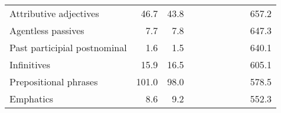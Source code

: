 \begin{table}[!t]
\begin{tabular*}{\linewidth}{@{\extracolsep{\fill}}lrrrrrrrrr}
Attributive adjectives & 46.7 & 43.8 & {\cellcolor[HTML]{92C5DE}{\textcolor[HTML]{000000}{140\%}}} & {\cellcolor[HTML]{92C5DE}{\textcolor[HTML]{000000}{150\%}}} & {\cellcolor[HTML]{F7F7F7}{\textcolor[HTML]{000000}{100\%}}} & {\cellcolor[HTML]{F7F7F7}{\textcolor[HTML]{000000}{104\%}}} & {\cellcolor[HTML]{FDDBC7}{\textcolor[HTML]{000000}{79\%}}} & {\cellcolor[HTML]{FDDBC7}{\textcolor[HTML]{000000}{83\%}}} & 657.2 \\ 
Agentless passives & 7.7 & 7.8 & {\cellcolor[HTML]{F4A582}{\textcolor[HTML]{000000}{51\%}}} & {\cellcolor[HTML]{F4A582}{\textcolor[HTML]{000000}{53\%}}} & {\cellcolor[HTML]{F7F7F7}{\textcolor[HTML]{000000}{96\%}}} & {\cellcolor[HTML]{FDDBC7}{\textcolor[HTML]{000000}{89\%}}} & {\cellcolor[HTML]{F7F7F7}{\textcolor[HTML]{000000}{101\%}}} & {\cellcolor[HTML]{F7F7F7}{\textcolor[HTML]{000000}{98\%}}} & 647.3 \\ 
Past participial postnominal & 1.6 & 1.5 & {\cellcolor[HTML]{4393C3}{\textcolor[HTML]{FFFFFF}{257\%}}} & {\cellcolor[HTML]{4393C3}{\textcolor[HTML]{FFFFFF}{235\%}}} & {\cellcolor[HTML]{FDDBC7}{\textcolor[HTML]{000000}{75\%}}} & {\cellcolor[HTML]{FDDBC7}{\textcolor[HTML]{000000}{75\%}}} & {\cellcolor[HTML]{D1E5F0}{\textcolor[HTML]{000000}{129\%}}} & {\cellcolor[HTML]{D1E5F0}{\textcolor[HTML]{000000}{131\%}}} & 640.1 \\ 
Infinitives & 15.9 & 16.5 & {\cellcolor[HTML]{FDDBC7}{\textcolor[HTML]{000000}{87\%}}} & {\cellcolor[HTML]{FDDBC7}{\textcolor[HTML]{000000}{83\%}}} & {\cellcolor[HTML]{92C5DE}{\textcolor[HTML]{000000}{140\%}}} & {\cellcolor[HTML]{D1E5F0}{\textcolor[HTML]{000000}{132\%}}} & {\cellcolor[HTML]{D1E5F0}{\textcolor[HTML]{000000}{120\%}}} & {\cellcolor[HTML]{D1E5F0}{\textcolor[HTML]{000000}{113\%}}} & 605.1 \\ 
Prepositional phrases & 101.0 & 98.0 & {\cellcolor[HTML]{D1E5F0}{\textcolor[HTML]{000000}{118\%}}} & {\cellcolor[HTML]{D1E5F0}{\textcolor[HTML]{000000}{118\%}}} & {\cellcolor[HTML]{F7F7F7}{\textcolor[HTML]{000000}{100\%}}} & {\cellcolor[HTML]{F7F7F7}{\textcolor[HTML]{000000}{100\%}}} & {\cellcolor[HTML]{FDDBC7}{\textcolor[HTML]{000000}{87\%}}} & {\cellcolor[HTML]{F7F7F7}{\textcolor[HTML]{000000}{90\%}}} & 578.5 \\ 
Emphatics & 8.6 & 9.2 & {\cellcolor[HTML]{F4A582}{\textcolor[HTML]{000000}{75\%}}} & {\cellcolor[HTML]{F4A582}{\textcolor[HTML]{000000}{68\%}}} & {\cellcolor[HTML]{F7F7F7}{\textcolor[HTML]{000000}{97\%}}} & {\cellcolor[HTML]{F7F7F7}{\textcolor[HTML]{000000}{98\%}}} & {\cellcolor[HTML]{FDDBC7}{\textcolor[HTML]{000000}{76\%}}} & {\cellcolor[HTML]{F4A582}{\textcolor[HTML]{000000}{75\%}}} & 552.3 \\ 

\end{tabular*}
\end{table}
